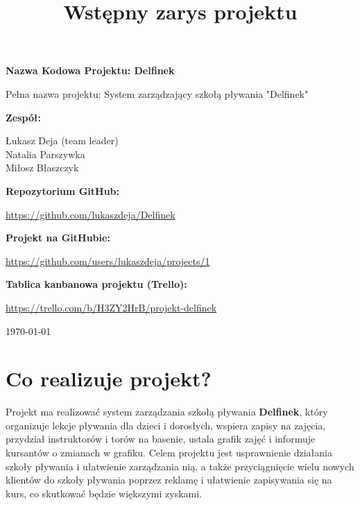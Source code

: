 \documentclass[a4paper,12pt]{article}
\title{Wstępny zarys projektu}
\begin{document}
\begin{titlepage}
    \centering



    {\Huge \textbf{Nazwa Kodowa Projektu: Delfinek}\par}
    \vspace{0.5cm}

    {\Large Pełna nazwa projektu: System zarządzający szkołą pływania "Delfinek"\par}
    \vspace{2cm}

    {\large \textbf{Zespół:}\par}
    \vspace{0.5cm}
    {\large
    Łukasz Deja (team leader)\\
    Natalia Parszywka\\
    Miłosz Błaszczyk\\
    }
    \vspace{2cm}

    {\large \textbf{Repozytorium GitHub:}\par}
    \href{https://github.com/lukaszdeja/Delfinek}{https://github.com/lukaszdeja/Delfinek}

    \vspace{1cm}
    
    {\large \textbf{Projekt na GitHubie:}\par}
    \href{https://github.com/users/lukaszdeja/projects/1}{https://github.com/users/lukaszdeja/projects/1}
    
    \vspace{1cm}
    
    {\large \textbf{Tablica kanbanowa projektu (Trello):}\par}
    \href{https://trello.com/b/H3ZY2HrB/projekt-delfinek}{https://trello.com/b/H3ZY2HrB/projekt-delfinek}

    \vfill

    {\large \today\par}

\end{titlepage}



\section{Co realizuje projekt?}

Projekt ma realizować system zarządzania szkołą pływania \textbf{Delfinek}, który organizuje lekcje pływania dla dzieci i dorosłych, wspiera zapisy na zajęcia, przydział instruktorów i torów na basenie, ustala grafik zajęć i informuje kursantów o zmianach w grafiku. Celem projektu jest usprawnienie działania szkoły pływania i ułatwienie zarządzania nią, a także przyciągnięcie wielu nowych klientów do szkoły pływania poprzez reklamę i ułatwienie zapisywania się na kurs, co skutkować będzie większymi zyskami.
\end{document}

